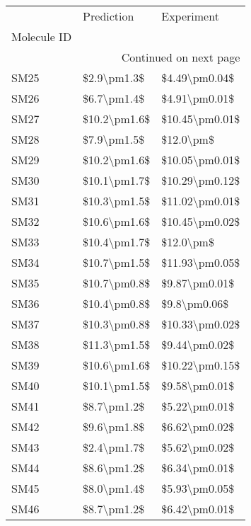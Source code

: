 \begin{longtable}{lll}
\toprule
{} &    Prediction &      Experiment \\
Molecule ID &               &                 \\
\midrule
\endhead
\midrule
\multicolumn{3}{r}{{Continued on next page}} \\
\midrule
\endfoot

\bottomrule
\endlastfoot
SM25        &   \$2.9\textbackslash pm1.3\$ &   \$4.49\textbackslash pm0.04\$ \\
SM26        &   \$6.7\textbackslash pm1.4\$ &   \$4.91\textbackslash pm0.01\$ \\
SM27        &  \$10.2\textbackslash pm1.6\$ &  \$10.45\textbackslash pm0.01\$ \\
SM28        &   \$7.9\textbackslash pm1.5\$ &       \$12.0\textbackslash pm\$ \\
SM29        &  \$10.2\textbackslash pm1.6\$ &  \$10.05\textbackslash pm0.01\$ \\
SM30        &  \$10.1\textbackslash pm1.7\$ &  \$10.29\textbackslash pm0.12\$ \\
SM31        &  \$10.3\textbackslash pm1.5\$ &  \$11.02\textbackslash pm0.01\$ \\
SM32        &  \$10.6\textbackslash pm1.6\$ &  \$10.45\textbackslash pm0.02\$ \\
SM33        &  \$10.4\textbackslash pm1.7\$ &       \$12.0\textbackslash pm\$ \\
SM34        &  \$10.7\textbackslash pm1.5\$ &  \$11.93\textbackslash pm0.05\$ \\
SM35        &  \$10.7\textbackslash pm0.8\$ &   \$9.87\textbackslash pm0.01\$ \\
SM36        &  \$10.4\textbackslash pm0.8\$ &    \$9.8\textbackslash pm0.06\$ \\
SM37        &  \$10.3\textbackslash pm0.8\$ &  \$10.33\textbackslash pm0.02\$ \\
SM38        &  \$11.3\textbackslash pm1.5\$ &   \$9.44\textbackslash pm0.02\$ \\
SM39        &  \$10.6\textbackslash pm1.6\$ &  \$10.22\textbackslash pm0.15\$ \\
SM40        &  \$10.1\textbackslash pm1.5\$ &   \$9.58\textbackslash pm0.01\$ \\
SM41        &   \$8.7\textbackslash pm1.2\$ &   \$5.22\textbackslash pm0.01\$ \\
SM42        &   \$9.6\textbackslash pm1.8\$ &   \$6.62\textbackslash pm0.02\$ \\
SM43        &   \$2.4\textbackslash pm1.7\$ &   \$5.62\textbackslash pm0.02\$ \\
SM44        &   \$8.6\textbackslash pm1.2\$ &   \$6.34\textbackslash pm0.01\$ \\
SM45        &   \$8.0\textbackslash pm1.4\$ &   \$5.93\textbackslash pm0.05\$ \\
SM46        &   \$8.7\textbackslash pm1.2\$ &   \$6.42\textbackslash pm0.01\$ \\
\end{longtable}

